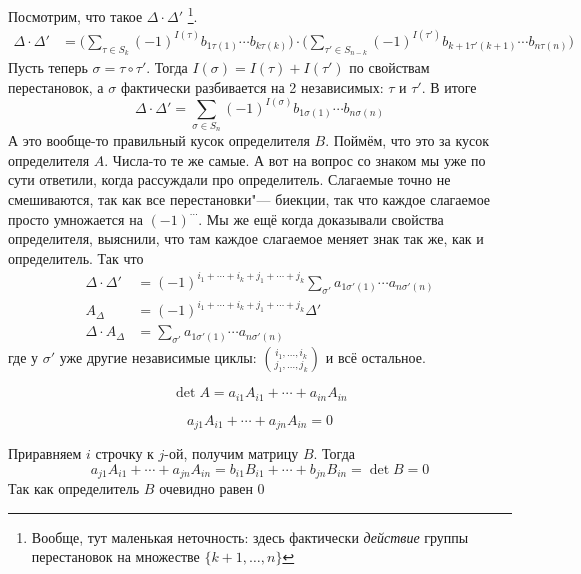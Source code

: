 \documentclass[12pt]{../../../notes}
\begin{document}
\begin{ittproof}
  Посмотрим, что такое  $\Delta\cdot \Delta'$
  \footnote{Вообще, тут маленькая неточность: здесь фактически 
      \emph{действие} группы перестановок на множестве $\{k+1, \dotsc , n\}$}.
  \begin{align*}
    \Delta \cdot \Delta' 
    &= \Bigg( \sum_{\tau \in S_k} (-1)^{I(\tau)} b_{1\tau(1)} \dotsm
    b_{k\tau(k)} \Bigg) \cdot \Bigg( \sum_{\tau' \in S_{n-k}} (-1)^{I(\tau')} b_{k+1\tau'(k+1)} \dotsm
    b_{n\tau(n)} \Bigg)
  \end{align*}
  Пусть теперь $\sigma = \tau \circ \tau'$. Тогда $I(\sigma) = I(\tau)+I(\tau')$ по свойствам
  перестановок, а $\sigma$ фактически разбивается на 2 независимых: $\tau$ и $\tau'$.
  В итоге
  \[
    \Delta \cdot \Delta' 
    = \sum_{\sigma\in S_n} (-1)^{I(\sigma)} b_{1\sigma(1)} \dotsm b_{n\sigma(n)}
  \]
  А это вообще-то правильный кусок определителя $B$. 
  Поймём, что это за кусок определителя $A$.
  Числа-то те же самые. А вот на вопрос со знаком мы уже по сути ответили, когда рассуждали про 
  определитель. Слагаемые точно не смешиваются, так как все перестановки"--- биекции, 
  так что каждое слагаемое просто умножается на $(-1)^{\cdots}$. Мы же ещё когда доказывали свойства определителя,
  выяснили, что там каждое слагаемое меняет знак так же, как и определитель.
  Так что 
  \begin{align*}
    \Delta \cdot \Delta' &= (-1)^{i_1  + \dotsb + i_k  + j_1  + \dotsb + j_k } 
    \sum_{\sigma'} a_{1\sigma'(1)} \dotsm a_{n\sigma'(n)} \\
    A_{\Delta} &= (-1)^{i_1  + \dotsb + i_k  + j_1  + \dotsb + j_k } \Delta'  \\
    \Delta \cdot A_{\Delta} &= \sum_{\sigma'} a_{1\sigma'(1)} \dotsm a_{n\sigma'(n)}
  \end{align*}
  где у $\sigma'$ уже другие независимые циклы: ${i_1, \dotsc , i_k\choose j_1, \dotsc , j_k }$ 
  и всё остальное.
\end{ittproof}
\begin{imp}
  \[
    \det A = a_{i1} A_{i1} + \dotsb + a_{in} A_{in} 
  \]
\end{imp}
\begin{imp}
  \[
    a_{j1} A_{i1} + \dotsb + a_{jn} A_{in} = 0
  \]
\end{imp}
\begin{itlproof}
  Приравняем $i$ строчку к $j$-ой, получим матрицу $B$. Тогда
  \[
    a_{j1} A_{i1} + \dotsb + a_{jn} A_{in} = b_{i1} B_{i1} + \dotsb + b_{jn} B_{in} = \det B = 0
  \]
  Так как определитель $B$ очевидно равен 0
\end{itlproof}
\end{document}
